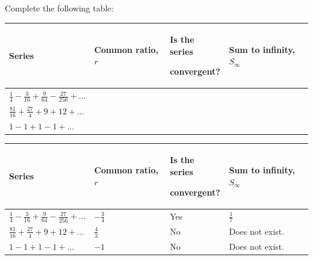 \documentclass[11pt,a4paper]{book}
\begin{document}
\begin{example}

Complete the following table:

\bigskip

\setlength{\extrarowheight}{12pt}

\begin{tabular}{|>{\centering}p{4.5cm}|>{\centering}p{3cm}|>{\centering}m{3cm}|>{\centering}p{3.5cm}|}
\hline
Series

\medskip{} & Common ratio, $r$ & Is the series

convergent? & Sum to infinity, $S_{\infty}$\tabularnewline
\hline
${\displaystyle \frac{1}{4}-\frac{3}{16}+\frac{9}{64}-\frac{27}{256}+\ldots}$

\medskip{} &  &  & \tabularnewline
\hline
${\displaystyle \frac{81}{16}+\frac{27}{4}+9+12+\ldots}$

\medskip{} &  &  & \tabularnewline
\hline
$1-1+1-1+\ldots$

\medskip{} &  &  & \tabularnewline
\hline
\end{tabular}

\bigskip

\Solution

\setlength{\extrarowheight}{12pt}

\begin{tabular}{|>{\centering}p{4.5cm}|>{\centering}p{3cm}|>{\centering}m{3cm}|>{\centering}p{3.5cm}|}
\hline
Series

\medskip{} & Common ratio, $r$ & Is the series

convergent? & Sum to infinity, $S_{\infty}$\tabularnewline
\hline
${\displaystyle \frac{1}{4}-\frac{3}{16}+\frac{9}{64}-\frac{27}{256}+\ldots}$

\medskip{} & ${\displaystyle -\frac{3}{4}}$ & Yes & ${\displaystyle \frac{1}{7}}$

\medskip{}\tabularnewline
\hline
${\displaystyle \frac{81}{16}+\frac{27}{4}+9+12+\ldots}$

\medskip{} & ${\displaystyle \frac{4}{3}}$ & No & Does not exist.

\medskip{}\tabularnewline
\hline
$1-1+1-1+\ldots$

\medskip{} & $-1$ & No & Does not exist.

\medskip{}\tabularnewline
\hline
\end{tabular}

\end{example}
\end{document}

